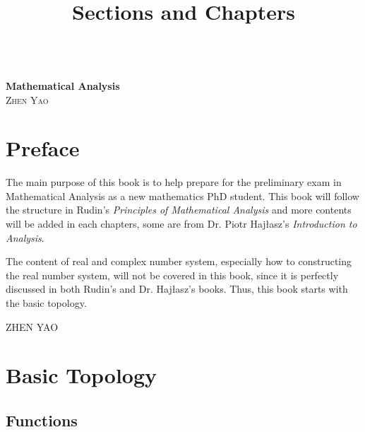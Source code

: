 \documentclass[11pt]{book}
\title{Sections and Chapters}
\theoremstyle{definition}
\numberwithin{equation}{chapter}
\begin{document}
\frontmatter

\begin{titlepage}
	\begin{center}
	\textbf{\LARGE{}} \\
	\vspace{40mm}
    \textbf{\Huge{Mathematical Analysis}} \\
    \medskip
    \vspace{10mm} %
    \large{\textsc{Zhen Yao}}\\
    \end{center}
\end{titlepage}

\tableofcontents{}
\mainmatter

\newpage

\chapter*{Preface}

The main purpose of this book is to help prepare for the preliminary exam in Mathematical Analysis as a new mathematics PhD student. This book will follow the structure in Rudin's {\it Principles of Mathematical Analysis}\cite{1} and more contents will be added in each chapters, some are from Dr. Piotr Hajłasz's {\it Introduction to Analysis}\cite{2}.

The content of real and complex number system, especially how to constructing the real number system, will not be covered in this book, since it is perfectly discussed in both Rudin's and Dr. Hajłasz's books. Thus, this book starts with the basic topology. 

\null\hfill ZHEN YAO

\newpage

\chapter{Basic Topology}

\section{Functions}
\end{document}
